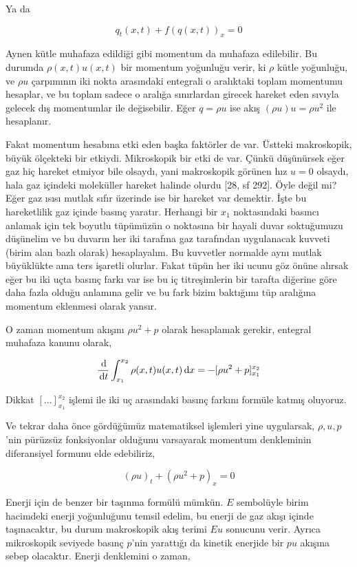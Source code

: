 \documentclass[12pt,fleqn]{article}\usepackage{../../common}
\begin{document}
Ya da

$$
q_t(x,t) + f(q(x,t))_x  = 0
$$

Aynen kütle muhafaza edildiği gibi momentum da muhafaza edilebilir. Bu durumda
$\rho(x,t) u(x,t)$ bir momentum yoğunluğu verir, ki $\rho$ kütle yoğunluğu, ve
$\rho u$ çarpımının iki nokta arasındaki entegrali o aralıktaki toplam momentumu
hesaplar, ve bu toplam sadece o aralığa sınırlardan girecek hareket eden sıvıyla
gelecek dış momentumlar ile değisebilir. Eğer $q = \rho u$ ise akış
$(\rho u) u = \rho u^2$ ile hesaplanır.

Fakat momentum hesabına etki eden başka faktörler de var. Üstteki makroskopik,
büyük ölçekteki bir etkiydi. Mikroskopik bir etki de var. Çünkü düşünürsek eğer
gaz hiç hareket etmiyor bile olsaydı, yani makroskopik görünen hız $u=0$
olsaydı, hala gaz içindeki moleküller hareket halinde olurdu [28, sf 292]. Öyle
değil mi?  Eğer gaz ısısı mutlak sıfır üzerinde ise bir hareket var
demektir. İşte bu hareketlilik gaz içinde basınç yaratır. Herhangi bir $x_1$
noktasındaki basıncı anlamak için tek boyutlu tüpümüzün o noktasına bir hayali
duvar soktuğumuzu düşünelim ve bu duvarın her iki tarafına gaz tarafından
uygulanacak kuvveti (birim alan bazlı olarak) hesaplayalım. Bu kuvvetler
normalde aynı mutlak büyüklükte ama ters işaretli olurlar. Fakat tüpün her
iki ucunu göz önüne alırsak eğer bu iki uçta basınç farkı var ise bu
iç titreşimlerin bir tarafta diğerine göre daha fazla olduğu anlamına gelir
ve bu fark bizim baktığımı tüp aralığına momentum eklenmesi olarak yansır.

O zaman momentum akışını $\rho u^2 + p$ olarak hesaplamak gerekir, entegral
muhafaza kanunu olarak,

$$
\frac{\,\mathrm{d}}{\,\mathrm{d} t} \int_{x_1}^{x_2} 
\rho(x,t) u(x,t) \,\mathrm{d} x = - [\rho u^2 + p]_{x_1}^{x_2}
$$

Dikkat $[ ... ]_{x_1}^{x_2}$ işlemi ile iki uç arasındaki basınç farkını
formüle katmış oluyoruz.

Ve tekrar daha önce gördüğümüz matematiksel işlemleri yine uygularsak,
$\rho,u,p$'nin pürüzsüz fonksiyonlar olduğunu varsayarak momentum denkleminin
diferansiyel formunu elde edebiliriz,

$$
(\rho u)_t + (\rho u^2 + p)_x = 0
$$

Enerji için de benzer bir taşınma formülü mümkün. $E$ sembolüyle birim hacimdeki
enerji yoğunluğunu temsil edelim, bu enerji de gaz akışı içinde taşınacaktır, bu
durum makroskopik akış terimi $E u$ sonucunu verir. Ayrıca mikroskopik seviyede
basınç $p$'nin yarattığı da kinetik enerjide bir $pu$ akışına sebep olacaktır.
Enerji denklemini o zaman,
\end{document}
